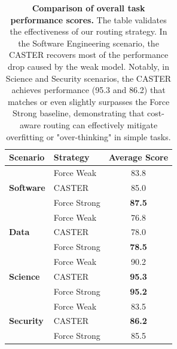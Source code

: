 \documentclass{article}
\theoremstyle{plain}
\theoremstyle{definition}
\theoremstyle{remark}
\begin{document}
\begin{table}[t]
    \centering
    \caption{\textbf{Comparison of overall task performance scores.} The table validates the effectiveness of our routing strategy. In the Software Engineering scenario, the CASTER recovers most of the performance drop caused by the weak model. Notably, in Science and Security scenarios, the CASTER achieves performance (95.3 and 86.2) that matches or even slightly surpasses the Force Strong baseline, demonstrating that cost-aware routing can effectively mitigate overfitting or "over-thinking" in simple tasks.}
    \label{tab:overall_performance}
    \begin{tabular}{llc}
        \toprule
        \textbf{Scenario} & \textbf{Strategy} & \textbf{Average Score} \\
        \midrule
        \multirow{3}{*}{\textbf{Software}} 
        & Force Weak   & 83.8 \\
        & CASTER& 85.0 \\ %
        & Force Strong & \textbf{87.5}\\ %
        \midrule
        \multirow{3}{*}{\textbf{Data}} 
        & Force Weak   & 76.8\\
        & CASTER& 78.0\\ %
        & Force Strong & \textbf{78.5}\\ %
        \midrule
        \multirow{3}{*}{\textbf{Science}} 
        & Force Weak   & 90.2 \\
        & CASTER& \textbf{95.3} \\ %
        & Force Strong & \textbf{95.2}\\ %
        \midrule
        \multirow{3}{*}{\textbf{Security}} 
        & Force Weak   & 83.5 \\
        & CASTER& \textbf{86.2} \\ %
        & Force Strong & 85.5 \\ %
        \bottomrule
    \end{tabular}
\end{table}
\end{document}
